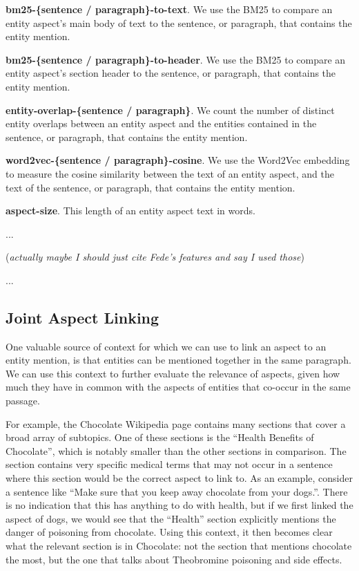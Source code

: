 \textbf{bm25-\{sentence / paragraph\}-to-text}. We use the BM25 to compare an entity aspect's main body of text to the sentence, or paragraph, that contains the entity mention. 

\textbf{bm25-\{sentence / paragraph\}-to-header}. We use the BM25 to compare an entity aspect's section header to the sentence, or paragraph, that contains the entity mention. 


\textbf{entity-overlap-\{sentence / paragraph\}}. We count the number of distinct entity overlaps between an entity aspect and the entities contained in the sentence, or paragraph, that contains the entity mention.

\textbf{word2vec-\{sentence / paragraph\}-cosine}. We use the Word2Vec embedding to measure the cosine similarity between the text of an entity aspect, and the text of the sentence, or paragraph, that contains the entity mention.

\textbf{aspect-size}. This length of an entity aspect text in words.

... 

(\textit{actually maybe I should just cite Fede's features and say I used those})

...



 \subsection{Joint Aspect Linking}\label{jordan-co-entity}
One valuable source of context for which we can use to link an aspect to an entity mention, is that entities can be mentioned together in the same paragraph.
We can use this context to further evaluate the relevance of aspects, given how much they have in common with the aspects of entities that co-occur in the same passage. 

For example, the Chocolate Wikipedia page contains many sections that cover a broad array of subtopics. One of these sections is the ``Health Benefits of Chocolate'', which is notably smaller than the other sections in comparison. The section contains very specific medical terms that may not occur in a sentence where this section would be the correct aspect to link to. As an example, consider a sentence like ``Make sure that you keep away chocolate from your dogs.''. There is no indication that this has anything to do with health, but if we first linked the aspect of dogs, we would see that the ``Health'' section explicitly mentions the danger of poisoning from chocolate. Using this context, it then becomes clear what the relevant section is in Chocolate: not the section that mentions chocolate the most, but the one that talks about Theobromine poisoning and side effects.

